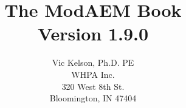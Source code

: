 \documentclass[12pt,oneside,english,palatino]{book}
\begin{document}
\title{The ModAEM Book\\
Version 1.9.0}

\author{Vic Kelson, Ph.D. PE \\
WHPA Inc.\\
320 West 8th St.\\
Bloomington, IN 47404}

\maketitle
\tableofcontents{}

\listoffigures






















\appendix

\end{document}
